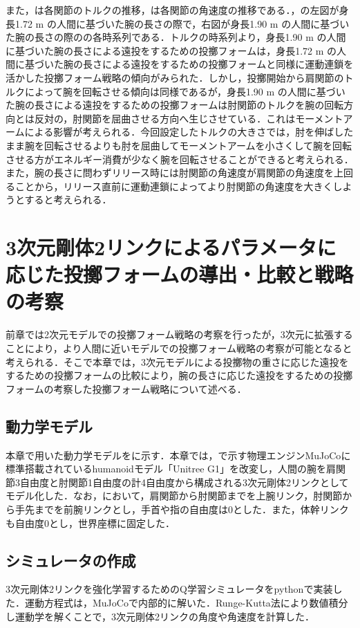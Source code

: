 \begin{small}
また，は各関節のトルクの推移，は各関節の角速度の推移である．，の左図が身長1.72 m の人間に基づいた腕の長さの際で，右図が身長1.90 m の人間に基づいた腕の長さの際のの各時系列である．トルクの時系列より，身長1.90 m の人間に基づいた腕の長さによる遠投をするための投擲フォームは，身長1.72 m の人間に基づいた腕の長さによる遠投をするための投擲フォームと同様に運動連鎖を活かした投擲フォーム戦略の傾向がみられた．しかし，投擲開始から肩関節のトルクによって腕を回転させる傾向は同様であるが，身長1.90 m の人間に基づいた腕の長さによる遠投をするための投擲フォームは肘関節のトルクを腕の回転方向とは反対の，肘関節を屈曲させる方向へ生じさせている．これはモーメントアームによる影響が考えられる．今回設定したトルクの大きさでは，肘を伸ばしたまま腕を回転させるよりも肘を屈曲してモーメントアームを小さくして腕を回転させる方がエネルギー消費が少なく腕を回転させることができると考えられる．また，腕の長さに問わずリリース時には肘関節の角速度が肩関節の角速度を上回ることから，リリース直前に運動連鎖によってより肘関節の角速度を大きくしようとすると考えられる．
\section{3次元剛体2リンクによるパラメータに応じた投擲フォームの導出・比較と戦略の考察}
前章では2次元モデルでの投擲フォーム戦略の考察を行ったが，3次元に拡張することにより，より人間に近いモデルでの投擲フォーム戦略の考察が可能となると考えられる．そこで本章では，3次元モデルによる投擲物の重さに応じた遠投をするための投擲フォームの比較により，腕の長さに応じた遠投をするための投擲フォームの考察した投擲フォーム戦略について述べる．
\subsection{動力学モデル}
本章で用いた動力学モデルをに示す．本章では，で示す物理エンジンMuJoCo\cite{mujoco}\cite{mujoco2}に標準搭載されているhumanoidモデル「Unitree G1」\cite{unitreeg1}を改変し，人間の腕を肩関節3自由度と肘関節1自由度の計4自由度から構成される3次元剛体2リンクとしてモデル化した．なお，において，肩関節から肘関節までを上腕リンク，肘関節から手先までを前腕リンクとし，手首や指の自由度は0とした．また，体幹リンクも自由度0とし，世界座標に固定した．
\subsection{シミュレータの作成}
3次元剛体2リンクを強化学習するためのQ学習シミュレータをpythonで実装した．運動方程式は，MuJoCoで内部的に解いた．Runge-Kutta法により数値積分し運動学を解くことで，3次元剛体2リンクの角度や角速度を計算した．

\end{small}
